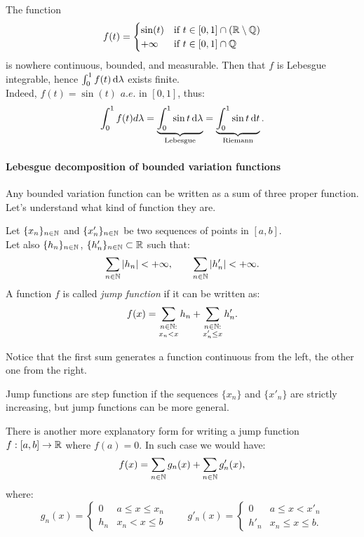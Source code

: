 The function
	$$f(t)=\begin{cases} 
	\sin(t) 		& \text{if } t \in \left[0,1\right]\cap \left(\mathbb R \setminus \mathbb Q \right) \\
	+ \infty 	   &  \text{if } t \in \left[0,1\right]\cap \mathbb Q
	\end{cases}$$
is nowhere continuous, bounded, and measurable. Then that $f$ is Lebesgue integrable, hence $\int_0^1 f(t) \,\mathrm d \lambda$ exists finite.\\
Indeed, $f(t) = \sin (t)$ $a.e.$ in $\left[0,1\right]$, thus:
	$$\int_0^1 f(t) d \lambda =\underbrace{\int_0^1 \sin t \,\mathrm d \lambda}_{\text{Lebesgue}}
	=\underbrace{\int_0^1 \sin t \,\mathrm d t}_{\text{Riemann}}.$$


\paragraph{Lebesgue decomposition of bounded variation functions} Any bounded variation function can be written as a sum of three proper function. Let's understand what kind of function they are.

\begin{defn}
	Let $\{x_n\}_{n\in\mathbb N}$ and $\{x_n'\}_{n\in\mathbb N}$ be two sequences of points in $[a,b]$. \\
	Let also $\{h_n\}_{n\in\mathbb N}$, $\{h_n'\}_{n\in\mathbb N} \subset \mathbb R$ such that:
	$$
	\sum_{n\in\mathbb N} |h_n| 
	< +\infty, 
	\qquad \sum_{n\in \mathbb N}|h_n'| 
	< +\infty
	.
	$$
	A function $f$ is called \emph{jump function} if it can be written as:
	$$
	f(x) 
	= \sum_{\substack{n \in \mathbb N:\\ x_n \vphantom{x_n' \le} < x }} h_n 
	+ \sum_{\substack{n \in \mathbb N:\\ x_n'\le x}} h'_n
	.$$
\end{defn}


Notice that the first sum generates a function continuous from the left, the other one from the right.

Jump functions are step function if the sequences $\{x_n\}$ and $\{x'_n\}$ are strictly increasing, but jump functions can be more general.

There is another more explanatory form for writing a jump function $f:[a,b] \to \mathbb R$ where $f(a)=0$. In such case we would have:
$$f(x) = \sum_{n\in\mathbb N}g_n(x) + \sum_{n\in\mathbb N}g'_n(x),$$
where:
$$ g_n(x) = \begin{cases}
0 & a \leq x \leq x_n\\
h_n & x_n < x \leq b
\end{cases} \qquad 
g'_n(x)= \begin{cases}
0 & a \leq x < x'_n\\
h'_n & x_n \leq x \leq b.
\end{cases}
$$

